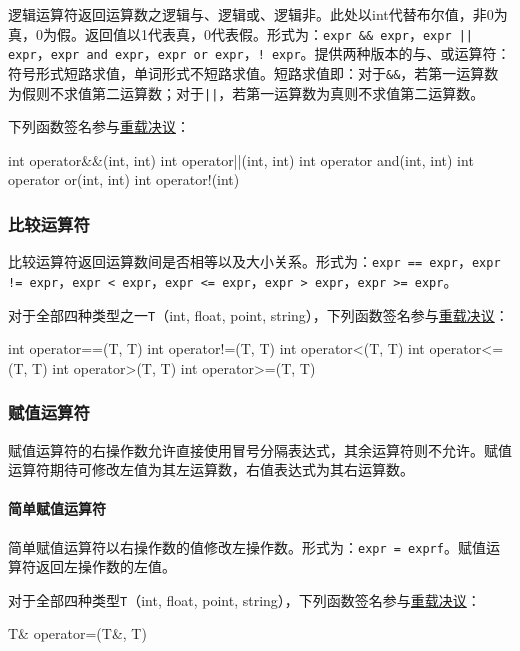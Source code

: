\documentclass[UTF8]{ctexart}
\begin{document}
逻辑运算符返回运算数之逻辑与、逻辑或、逻辑非。此处以int代替布尔值，非0为真，0为假。返回值以1代表真，0代表假。形式为：\verb|expr && expr|，\verb&expr || expr&，\verb|expr and expr|，\verb&expr or expr&，\verb|! expr|。提供两种版本的与、或运算符：符号形式短路求值，单词形式不短路求值。短路求值即：对于\verb|&&|，若第一运算数为假则不求值第二运算数；对于\verb&||&，若第一运算数为真则不求值第二运算数。

下列函数签名参与\hyperref[chongzai]{重载决议}：
\begin{MUAvbt}
int operator&&(int, int)
int operator||(int, int)
int operator and(int, int)
int operator or(int, int)
int operator!(int)
\end{MUAvbt}

\subsubsection{比较运算符}
\label{bijiao}

比较运算符返回运算数间是否相等以及大小关系。形式为：\verb|expr == expr|，\verb|expr != expr|，\verb|expr < expr|，\verb|expr <= expr|，\verb|expr > expr|，\verb|expr >= expr|。

对于全部四种类型之一\verb|T|（int, float, point, string），下列函数签名参与\hyperref[chongzai]{重载决议}：
\begin{MUAvbt}
int operator==(T, T)
int operator!=(T, T)
int operator<(T, T)
int operator<=(T, T)
int operator>(T, T)
int operator>=(T, T)
\end{MUAvbt}

\subsubsection{赋值运算符}
\label{fuzhi}

赋值运算符的右操作数允许直接使用冒号分隔表达式，其余运算符则不允许。赋值运算符期待可修改左值为其左运算数，右值表达式为其右运算数。

\paragraph{简单赋值运算符} 简单赋值运算符以右操作数的值修改左操作数。形式为：\verb|expr = exprf|。赋值运算符返回左操作数的左值。

对于全部四种类型\verb|T|（int, float, point, string），下列函数签名参与\hyperref[chongzai]{重载决议}：
\begin{MUAvbt}
T& operator=(T&, T)
\end{MUAvbt}
\end{document}
